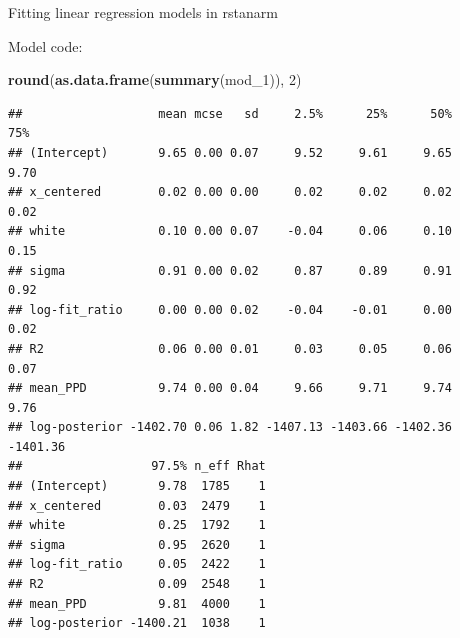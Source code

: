 \documentclass[ignorenonframetext,]{beamer}
\newenvironment{Shaded}{\begin{snugshade}}{\end{snugshade}}
\newcommand{\KeywordTok}[1]{\textcolor[rgb]{0.13,0.29,0.53}{\textbf{#1}}}
\newcommand{\DataTypeTok}[1]{\textcolor[rgb]{0.13,0.29,0.53}{#1}}
\newcommand{\DecValTok}[1]{\textcolor[rgb]{0.00,0.00,0.81}{#1}}
\newcommand{\FloatTok}[1]{\textcolor[rgb]{0.00,0.00,0.81}{#1}}
\newcommand{\StringTok}[1]{\textcolor[rgb]{0.31,0.60,0.02}{#1}}
\newcommand{\OperatorTok}[1]{\textcolor[rgb]{0.81,0.36,0.00}{\textbf{#1}}}
\newcommand{\NormalTok}[1]{#1}
\begin{document}
\begin{frame}[fragile]{Fitting linear regression models in rstanarm}

Model code: \tiny

\begin{Shaded}
\end{Shaded}

\begin{Shaded}
\begin{Highlighting}[]
\KeywordTok{round}\NormalTok{(}\KeywordTok{as.data.frame}\NormalTok{(}\KeywordTok{summary}\NormalTok{(mod_}\DecValTok{1}\NormalTok{)), }\DecValTok{2}\NormalTok{)}
\end{Highlighting}
\end{Shaded}

\begin{verbatim}
##                   mean mcse   sd     2.5%      25%      50%      75%
## (Intercept)       9.65 0.00 0.07     9.52     9.61     9.65     9.70
## x_centered        0.02 0.00 0.00     0.02     0.02     0.02     0.02
## white             0.10 0.00 0.07    -0.04     0.06     0.10     0.15
## sigma             0.91 0.00 0.02     0.87     0.89     0.91     0.92
## log-fit_ratio     0.00 0.00 0.02    -0.04    -0.01     0.00     0.02
## R2                0.06 0.00 0.01     0.03     0.05     0.06     0.07
## mean_PPD          9.74 0.00 0.04     9.66     9.71     9.74     9.76
## log-posterior -1402.70 0.06 1.82 -1407.13 -1403.66 -1402.36 -1401.36
##                  97.5% n_eff Rhat
## (Intercept)       9.78  1785    1
## x_centered        0.03  2479    1
## white             0.25  1792    1
## sigma             0.95  2620    1
## log-fit_ratio     0.05  2422    1
## R2                0.09  2548    1
## mean_PPD          9.81  4000    1
## log-posterior -1400.21  1038    1
\end{verbatim}

\end{frame}
\end{document}
